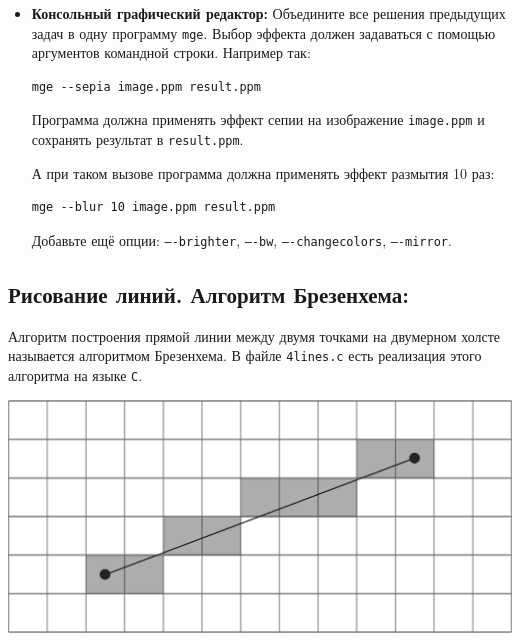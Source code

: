 \documentclass{article}
\begin{document}
\begin{itemize}

\item \textbf{Консольный графический редактор:} Объедините все решения предыдущих задач в одну программу \texttt{mge}. Выбор эффекта должен задаваться с помощью аргументов командной строки. Например так:
\begin{verbatim}
mge --sepia image.ppm result.ppm
\end{verbatim}
Программа должна применять эффект сепии на изображение \texttt{image.ppm} и сохранять результат в \texttt{result.ppm}.

А при таком вызове программа должна применять эффект размытия 10 раз:
\begin{verbatim}
mge --blur 10 image.ppm result.ppm
\end{verbatim}
Добавьте ещё опции: \texttt{----brighter}, \texttt{----bw}, \texttt{----changecolors}, \texttt{----mirror}.
\end{itemize}

\newpage
\subsection*{Рисование линий. Алгоритм Брезенхема:}
Алгоритм построения прямой линии между двумя точками на двумерном холсте называется алгоритмом Брезенхема.
В файле \texttt{4lines.c} есть реализация этого алгоритма на языке \texttt{C}.
\begin{center}
\includegraphics[scale=1]{../images/bresenham.png}
\end{center}
\end{document}

